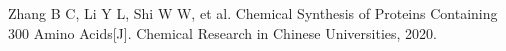 
\begin{resume}

  \begin{achievements}
    \item Zhang B C, Li Y L, Shi W W, et al. Chemical Synthesis of Proteins Containing 300 Amino Acids[J]. Chemical Research in Chinese Universities, 2020.
  \end{achievements}

\end{resume}
